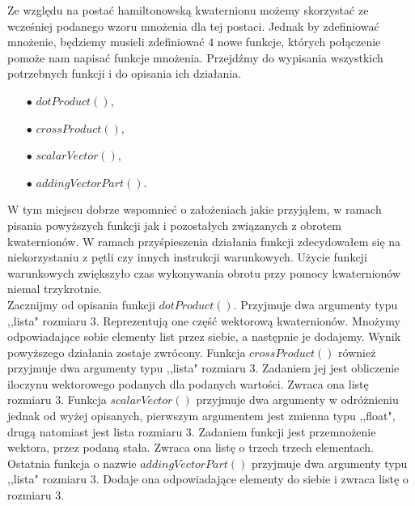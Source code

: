 \documentclass[a4paper,twoside,11pt,reqno]{mwrep}
\theoremstyle{plain} \newtheorem{twr}{Twierdzenie}
\theoremstyle{plain} \newtheorem{lem}{Lemat}
\theoremstyle{definition} \newtheorem{defi}{Definicja}
\theoremstyle{remark} \newtheorem*{wni}{Wniosek}
\theoremstyle{definition} \newtheorem{uwaga}{Uwaga}
\theoremstyle{definition}\newtheorem{prz}{Przykład}
\begin{document}
Ze względu na postać hamiltonowską kwaternionu możemy skorzystać ze wcześniej podanego
wzoru mnożenia dla tej postaci. Jednak by zdefiniować mnożenie, będziemy musieli
zdefiniować $4$ nowe funkcje, których połączenie pomoże nam napisać
funkcje mnożenia. Przejdźmy do wypisania wszystkich potrzebnych funkcji i do
opisania ich działania.
\begin{itemize}
\item[$\bullet$] $dotProduct()$,
\item[$\bullet$] $crossProduct()$,
\item[$\bullet$] $scalarVector()$,
\item[$\bullet$] $addingVectorPart()$.
\end{itemize} 
W tym miejscu dobrze wspomnieć o założeniach jakie przyjąłem, 
w ramach pisania powyższych funkcji jak i pozostałych związanych z obrotem kwaternionów.
W ramach przyśpieszenia działania funkcji zdecydowałem się na niekorzystaniu z pętli czy
innych instrukcji warunkowych. Użycie funkcji warunkowych zwiększyło czas wykonywania 
obrotu przy pomocy kwaternionów niemal trzykrotnie.\\
Zacznijmy od opisania funkcji $dotProduct()$. Przyjmuje dwa argumenty typu ,,lista" rozmiaru $3$.
Reprezentują one część wektorową kwaternionów. Mnożymy odpowiadające sobie elementy list przez siebie, 
a następnie je dodajemy. Wynik powyższego działania zostaje zwrócony.
Funkcja $crossProduct()$ również przyjmuje dwa argumenty typu ,,lista" rozmiaru $3$.
Zadaniem jej jest obliczenie iloczynu wektorowego podanych dla podanych wartości.
Zwraca ona listę rozmiaru $3$. Funkcja $scalarVector()$ przyjmuje dwa argumenty
w odróżnieniu jednak od wyżej opisanych, pierwszym argumentem jest zmienna typu ,,float", drugą
natomiast jest lista rozmiaru $3$. Zadaniem funkcji jest przemnożenie wektora, przez podaną stała.
Zwraca ona listę o trzech trzech elementach. Ostatnia funkcja o nazwie $addingVectorPart()$ przyjmuje 
dwa argumenty typu ,,lista" rozmiaru $3$. Dodaje ona odpowiadające elementy do siebie
i zwraca listę o rozmiaru $3$.\\
\end{document}

